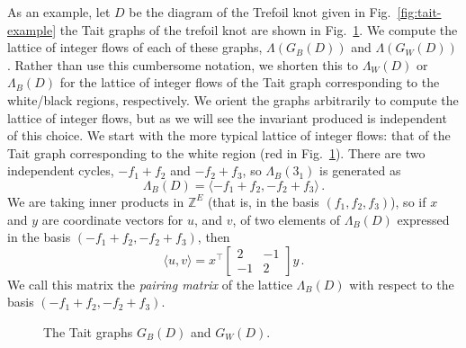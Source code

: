 \documentclass[12pt]{report}
\newcommand{\Z}{\mathbb{Z}}
\begin{document}
As an example, let $D$ be the diagram of the Trefoil knot given in Fig.~\ref{fig:tait-example} the Tait graphs of the trefoil knot   are shown in Fig.~\ref{fig:trefoil-abstract-tait}. We compute the lattice of integer flows of each of these graphs, $\Lambda(G_{B}(D))$ and $\Lambda(G_W(D))$. Rather than use this cumbersome notation, we shorten this to $\Lambda_{W}(D)$ or $\Lambda_{B}(D)$ for the lattice of integer flows of the Tait graph corresponding to the white/black regions, respectively. We orient the graphs arbitrarily to compute the lattice of integer flows, but as we will see the invariant produced is independent of this choice. We start with the more typical lattice of integer flows: that of the Tait graph corresponding to the white region (red in Fig.~\ref{fig:trefoil-abstract-tait}). There are two independent cycles, $-f_{1} + f_{2}$ and $-f_{2} + f_{3}$, so $\Lambda_{B}(3_{1})$ is generated as
\[\Lambda_{B}(D) = \langle -f_{1} + f_{2}, -f_{2} + f_{3} \rangle\,.\]
We are taking inner products in $\Z^{E}$ (that is, in the basis $(f_{1}, f_{2}, f_{3})$), so if $x$ and $y$ are coordinate vectors for $u$, and $v$, of two elements of $\Lambda_{B}(D)$ expressed in the basis $(-f_{1} + f_{2}, -f_{2} + f_{3})$, then
\[\langle u, v \rangle = x^{\top}\begin{bmatrix}
	2  & -1 \\
	-1 & 2
\end{bmatrix}y\,.\]
We call this matrix the \textit{pairing matrix} of the lattice $\Lambda_{B}(D)$ with respect to the basis ${(-f_{1} + f_{2}, -f_{2} + f_{3})}$.

\begin{figure}[hbt]
	\centering
	\def\svgscale{0.4}
	
	\caption{The Tait graphs $G_{B}(D)$ and $G_{W}(D)$.}
	\label{fig:trefoil-abstract-tait}
\end{figure}
\end{document}

